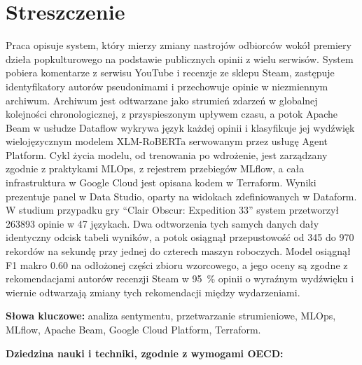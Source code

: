 \chapter*{Streszczenie}

Praca opisuje system, który mierzy zmiany nastrojów odbiorców wokół premiery dzieła popkulturowego na podstawie publicznych opinii z wielu serwisów.
System pobiera komentarze z serwisu YouTube i recenzje ze sklepu Steam, zastępuje identyfikatory autorów pseudonimami i przechowuje opinie w niezmiennym archiwum.
Archiwum jest odtwarzane jako strumień zdarzeń w globalnej kolejności chronologicznej, z przyspieszonym upływem czasu, a potok Apache Beam w usłudze Dataflow wykrywa język każdej opinii i klasyfikuje jej wydźwięk wielojęzycznym modelem XLM-RoBERTa serwowanym przez usługę Agent Platform.
Cykl życia modelu, od trenowania po wdrożenie, jest zarządzany zgodnie z praktykami MLOps, z rejestrem przebiegów MLflow, a cała infrastruktura w Google Cloud jest opisana kodem w Terraform.
Wyniki prezentuje panel w Data Studio, oparty na widokach zdefiniowanych w Dataform.
W studium przypadku gry \enquote{Clair Obscur: Expedition 33} system przetworzył \num{263893} opinie w 47 językach.
Dwa odtworzenia tych samych danych dały identyczny odcisk tabeli wyników, a potok osiągnął przepustowość od 345 do 970 rekordów na sekundę przy jednej do czterech maszyn roboczych.
Model osiągnął F1 makro \num{0.60} na odłożonej części zbioru wzorcowego, a jego oceny są zgodne z rekomendacjami autorów recenzji Steam w \qty{95}{\percent} opinii o wyraźnym wydźwięku i wiernie odtwarzają zmiany tych rekomendacji między wydarzeniami.

\bigskip
\noindent\textbf{Słowa kluczowe:} analiza sentymentu, przetwarzanie strumieniowe, MLOps, MLflow, Apache Beam, Google Cloud Platform, Terraform.

\noindent\textbf{Dziedzina nauki i techniki, zgodnie z wymogami OECD:} 
